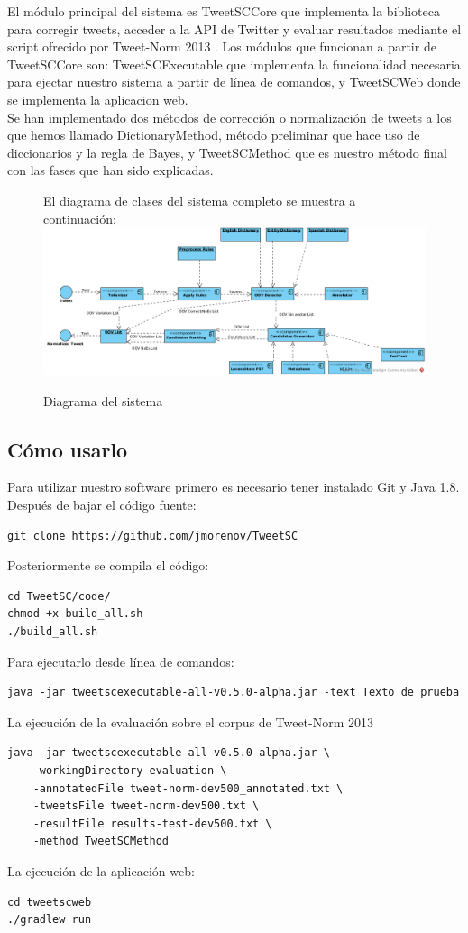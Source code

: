 \documentclass[spanish,12pt, a4paper,twoside]{paper}
\begin{document}
El módulo principal del sistema es TweetSCCore que implementa la biblioteca para corregir tweets, acceder a la API de Twitter y evaluar resultados mediante el script ofrecido por Tweet-Norm 2013 \cite{alegria:2013}. Los módulos que funcionan a partir de TweetSCCore son: TweetSCExecutable que implementa la funcionalidad necesaria para ejectar nuestro sistema a partir de línea de comandos, y TweetSCWeb donde se implementa la aplicacion web.\\

Se han implementado dos métodos de corrección o normalización de tweets a los que hemos llamado DictionaryMethod, método preliminar que hace uso de diccionarios y la regla de Bayes, y TweetSCMethod que es nuestro método final con las fases que han sido explicadas.

\begin{figure}[h]
El diagrama de clases del sistema completo se muestra a continuación:
 \includegraphics[width=1.2\textwidth]{recursos/DiagramaDelSistema.png}
\caption{Diagrama del sistema}
\label{fig:diagramadelsistema}
\end{figure}

\newpage
\subsection{Cómo usarlo}\label{sec:comousarlo}
Para utilizar nuestro software primero es necesario tener instalado Git y Java 1.8. Después de bajar el código fuente: 
\begin{verbatim}
git clone https://github.com/jmorenov/TweetSC
\end{verbatim}
Posteriormente se compila el código: 
\begin{verbatim}
cd TweetSC/code/
chmod +x build_all.sh
./build_all.sh
\end{verbatim}
Para ejecutarlo desde línea de comandos:
\begin{verbatim}
java -jar tweetscexecutable-all-v0.5.0-alpha.jar -text Texto de prueba
\end{verbatim}
La ejecución de la evaluación sobre el corpus de Tweet-Norm 2013 \cite{alegria:2013}
\begin{verbatim}
java -jar tweetscexecutable-all-v0.5.0-alpha.jar \
    -workingDirectory evaluation \
    -annotatedFile tweet-norm-dev500_annotated.txt \
    -tweetsFile tweet-norm-dev500.txt \
    -resultFile results-test-dev500.txt \
    -method TweetSCMethod
\end{verbatim}
La ejecución de la aplicación web:
\begin{verbatim}
cd tweetscweb
./gradlew run
\end{verbatim}
\end{document}
